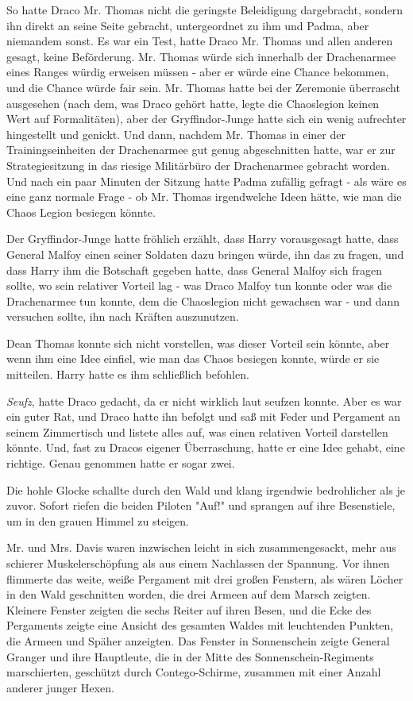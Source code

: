 {So hatte Draco Mr. Thomas nicht die geringste Beleidigung dargebracht, sondern ihn direkt an seine Seite gebracht, untergeordnet zu ihm und Padma, aber niemandem sonst. Es war ein Test, hatte Draco Mr. Thomas und allen anderen gesagt, keine Beförderung. Mr. Thomas würde sich innerhalb der Drachenarmee eines Ranges würdig erweisen müssen - aber er würde eine Chance bekommen, und die Chance würde fair sein. Mr. Thomas hatte bei der Zeremonie überrascht ausgesehen (nach dem, was Draco gehört hatte, legte die Chaoslegion keinen Wert auf Formalitäten), aber der Gryffindor-Junge hatte sich ein wenig aufrechter hingestellt und genickt. Und dann, nachdem Mr. Thomas in einer der Trainingseinheiten der Drachenarmee gut genug abgeschnitten hatte, war er zur Strategiesitzung in das riesige Militärbüro der Drachenarmee gebracht worden. Und nach ein paar Minuten der Sitzung hatte Padma zufällig gefragt - als wäre es eine ganz normale Frage - ob Mr. Thomas irgendwelche Ideen hätte, wie man die Chaos Legion besiegen könnte.

Der Gryffindor-Junge hatte fröhlich erzählt, dass Harry vorausgesagt hatte, dass General Malfoy einen seiner Soldaten dazu bringen würde, ihn das zu fragen, und dass Harry ihm die Botschaft gegeben hatte, dass General Malfoy sich fragen sollte, wo sein relativer Vorteil lag - was Draco Malfoy tun konnte oder was die Drachenarmee tun konnte, dem die Chaoslegion nicht gewachsen war - und dann versuchen sollte, ihn nach Kräften auszunutzen.

Dean Thomas konnte sich nicht vorstellen, was dieser Vorteil sein könnte, aber wenn ihm eine Idee einfiel, wie man das Chaos besiegen konnte, würde er sie mitteilen. Harry hatte es ihm schließlich befohlen.

\emph{Seufz}, hatte Draco gedacht, da er nicht wirklich laut seufzen konnte. Aber es war ein guter Rat, und Draco hatte ihn befolgt und saß mit Feder und Pergament an seinem Zimmertisch und listete alles auf, was einen relativen Vorteil darstellen könnte. Und, fast zu Dracos eigener Überraschung, hatte er eine Idee gehabt, eine richtige. Genau genommen hatte er sogar zwei.

Die hohle Glocke schallte durch den Wald und klang irgendwie bedrohlicher als je zuvor. Sofort riefen die beiden Piloten "Auf!" und sprangen auf ihre Besenstiele, um in den grauen Himmel zu steigen.

Mr. und Mrs. Davis waren inzwischen leicht in sich zusammengesackt, mehr aus schierer Muskelerschöpfung als aus einem Nachlassen der Spannung. Vor ihnen flimmerte das weite, weiße Pergament mit drei großen Fenstern, als wären Löcher in den Wald geschnitten worden, die drei Armeen auf dem Marsch zeigten. Kleinere Fenster zeigten die sechs Reiter auf ihren Besen, und die Ecke des Pergaments zeigte eine Ansicht des gesamten Waldes mit leuchtenden Punkten, die Armeen und Späher anzeigten. Das Fenster in Sonnenschein zeigte General Granger und ihre Hauptleute, die in der Mitte des Sonnenschein-Regiments marschierten, geschützt durch Contego-Schirme, zusammen mit einer Anzahl anderer junger Hexen.

}
